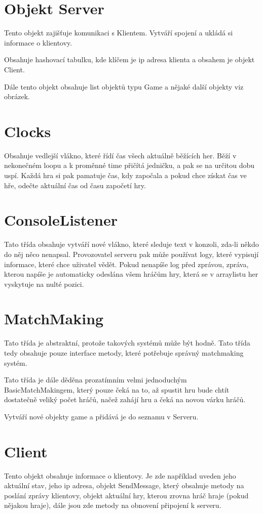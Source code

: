 \documentclass[12pt,a4paper]{report}
\begin{document}
\section{Objekt Server}
Tento objekt zajišťuje komunikaci s Klientem. Vytváří spojení a ukládá si informace o klientovy.

Obsahuje hashovací tabulku, kde klíčem je ip adresa klienta a obsahem je objekt Client.

Dále tento objekt obsahuje list objektů typu Game a nějaké další objekty viz obrázek.
 
\section{Clocks}
Obsahuje vedlejší vlákno, které řídí čas všech aktuálně běžících her. Běží v nekonečném loopu a k proměnné time přičítá jedničku, a pak se na určitou dobu uspí. Každá hra si pak pamatuje čas, kdy započala a pokud chce získat čas ve hře, odečte aktuální čas od času započetí hry.

\section{ConsoleListener}
Tato třída obsahuje vytváří nové vlákno, které sleduje text v konzoli, zda-li někdo do něj něco nenapsal. Provozovatel serveru pak může používat logy, které vypisují informace, které chce uživatel vědět. Pokud nenapíše log před zprávou, zpráva, kterou napíše je automaticky odeslána všem hráčům hry, která se v arraylistu her vyskytuje na nulté pozici.

\section{MatchMaking}
Tato třída je abstraktní, protože takových systémů může být hodně. Tato třída tedy obsahuje pouze interface metody, které potřebuje správný matchmaking systém. 

Tato třída je dále děděna prozatímním velmi jednoduchým BasicMatchMakingem, který pouze čeká na to, až spustit hru bude chtít dostatečně veliký počet hráčů, načež zahájí hru a čeká na novou várku hráčů.

Vytváří nové objekty game a přidává je do seznamu v Serveru.

\section{Client}
Tento objekt obsahuje informace o klientovy. Je zde například uveden jeho aktuální stav, jeho ip adresa, objekt SendMessage, který obsahuje metody na poslání zprávy klientovy, objekt aktuální hry, kterou zrovna hráč hraje (pokud nějakou hraje), dále jsou zde metody na obnovení připojení k serveru.
\end{document}
